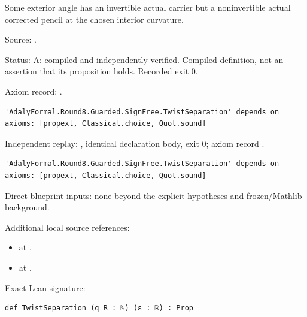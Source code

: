 \begin{definition}[bp-074]
\label{bp-074}
\uses{}
\leanok
Some exterior angle has an invertible actual carrier but a noninvertible actual corrected pencil at the chosen interior curvature.

\par Source: \texttt{}.
\par Status: A: compiled and independently verified. Compiled definition, not an assertion that its proposition holds. Recorded exit 0.
\par Axiom record: \texttt{}.
\begin{verbatim}
'AdalyFormal.Round8.Guarded.SignFree.TwistSeparation' depends on axioms: [propext, Classical.choice, Quot.sound]
\end{verbatim}
\par Independent replay: \texttt{}, identical declaration body, exit 0; axiom record \texttt{}.
\begin{verbatim}
'AdalyFormal.Round8.Guarded.SignFree.TwistSeparation' depends on axioms: [propext, Classical.choice, Quot.sound]
\end{verbatim}
\par Direct blueprint inputs: none beyond the explicit hypotheses and frozen/Mathlib background.
\par Additional local source references:
\begin{itemize}
\item \texttt{} at \texttt{}.
\item \texttt{} at \texttt{}.
\end{itemize}
\par Exact Lean signature:
\begin{verbatim}
def TwistSeparation (q R : ℕ) (ε : ℝ) : Prop
\end{verbatim}
\end{definition}

